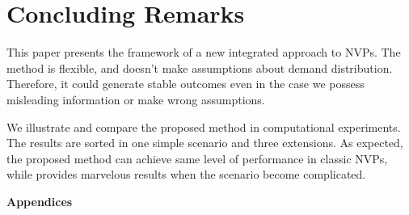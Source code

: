 \documentclass{article}
\begin{document}
\section{Concluding Remarks} \label{se:end}
This paper presents the framework of a new integrated approach to NVPs. The method is flexible, and doesn't make assumptions about demand distribution. Therefore, it could generate stable outcomes even in the case we possess misleading information or make wrong assumptions.

We illustrate and compare the proposed method in computational experiments. The results are sorted in one simple scenario and three extensions. As expected, the proposed method can achieve same level of performance in classic NVPs, while provides marvelous results when the scenario become complicated. 
\printbibliography

\newpage
\begin{center}
{\bf\Large Appendices}
\end{center}

\appendix
\end{document}
